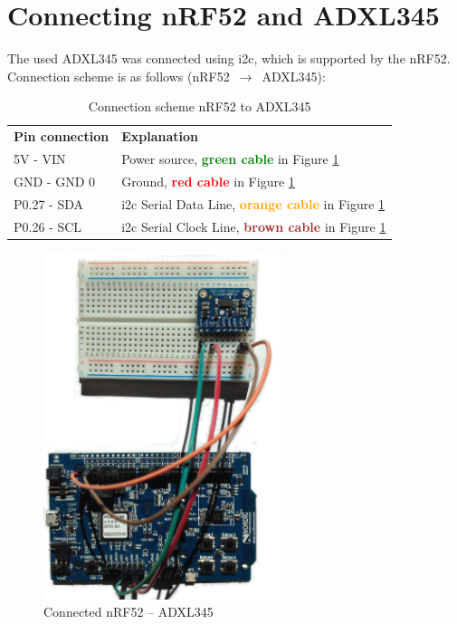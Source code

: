 \section{Connecting nRF52 and ADXL345}

\noindent The used \gls{ADXL345} was connected using \gls{i2c}, which is supported by the \gls{nRF52}. Connection scheme is as follows (\gls{nRF52} $\,\to\,$ \gls{ADXL345}): 

\begin{table}[H]
\centering
\caption{Connection scheme nRF52 to ADXL345}
\label{nRF52ADXL345connection}
\begin{tabular}{ll}
\textbf{Pin connection} & \textbf{Explanation}                                                                                            \\
5V - VIN               & Power source, \textbf{\textcolor{green}{green cable}} in Figure \ref{fig:nrf-adxl345}                   \\
GND - GND           0   & Ground, \textbf{\textcolor{red}{red cable}} in Figure \ref{fig:nrf-adxl345}                             \\
P0.27 - SDA            & \gls{i2c} Serial Data Line, \textbf{\textcolor{orange}{orange cable}} in Figure \ref{fig:nrf-adxl345} \\
P0.26 - SCL            & \gls{i2c} Serial Clock Line, \textbf{\textcolor{brown}{brown cable}} in Figure \ref{fig:nrf-adxl345} 
\end{tabular}
\end{table}


\begin{figure}[ht]
    \centering
    \includegraphics[width=0.62\textwidth]{connectionADXL-nrf5.png}    
    \caption{Connected nRF52 -- ADXL345}
    \label{fig:nrf-adxl345}
\end{figure}

